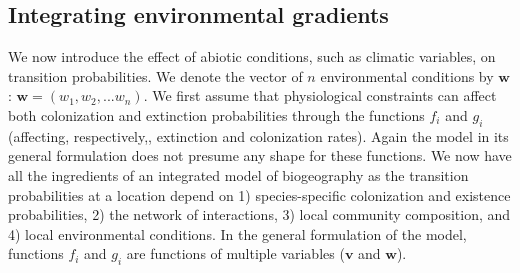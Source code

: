 \subsection{Integrating environmental gradients}

We now introduce the effect of abiotic conditions, such as climatic variables, on transition probabilities. We denote the vector of $n$ environmental conditions by $\mathbf{w}$: $\mathbf{w}=(w_1,w_2,...w_n)$. We first assume that physiological constraints can affect both colonization and extinction probabilities through the functions $f_i$ and $g_i$ (affecting, respectively,, extinction and colonization rates). Again the model in its general formulation does not presume any shape for these functions. We now have all the ingredients of an integrated model of biogeography as the transition probabilities at a location depend on 1) species-specific colonization and existence probabilities, 2) the network of interactions, 3) local community composition, and 4) local environmental conditions. In the general formulation of the model, functions $f_i$ and $g_i$ are functions of multiple variables ($\mathbf{v}$ and $\mathbf{w}$).

